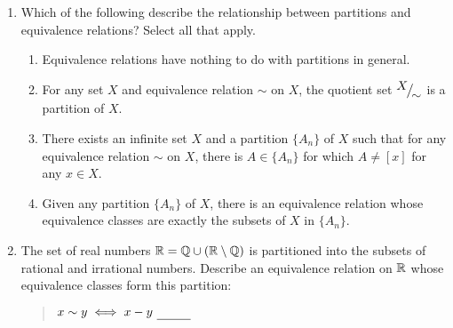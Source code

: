 \begin{enumerate}
	\item Which of the following describe the relationship between partitions and equivalence relations? Select all that apply.
	\begin{enumerate}
    \item Equivalence relations have nothing to do with partitions in general.
    \item For any set $X$ and equivalence relation $\sim$ on $X$, the quotient set ${}^{\textstyle {X}}\!\big/_{\textstyle \!{\sim}}$ is a partition of $X$.
    \item There exists an infinite set $X$ and a partition $\{A_n\}$ of $X$ such that for any equivalence relation $\sim$ on $X$, there is $A \in \{A_n\}$ for which $A \neq [x]$ for any $x \in X$.
    \item Given any partition $\{A_n\}$ of $X$, there is an equivalence relation whose equivalence classes are exactly the subsets of $X$ in $\{A_n\}$.
	\end{enumerate}
	
	
	\item The set of real numbers $\mathbb{R}=\mathbb{Q}\cup(\mathbb{R}\setminus\mathbb{Q})$ is partitioned into the subsets of rational and irrational numbers. Describe an equivalence relation on $\mathbb{R}$ whose equivalence classes form this partition:
	\begin{quote}
		$x\sim y\iff x-y\ \underline{\phantom{\in\Q\quad}}$
	\end{quote}
\end{enumerate}



